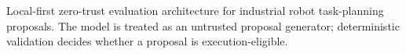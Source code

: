 \caption{Local-first zero-trust evaluation architecture for industrial robot task-planning proposals. The model is treated as an untrusted proposal generator; deterministic validation decides whether a proposal is execution-eligible.}
\label{fig:zero_trust_architecture}
